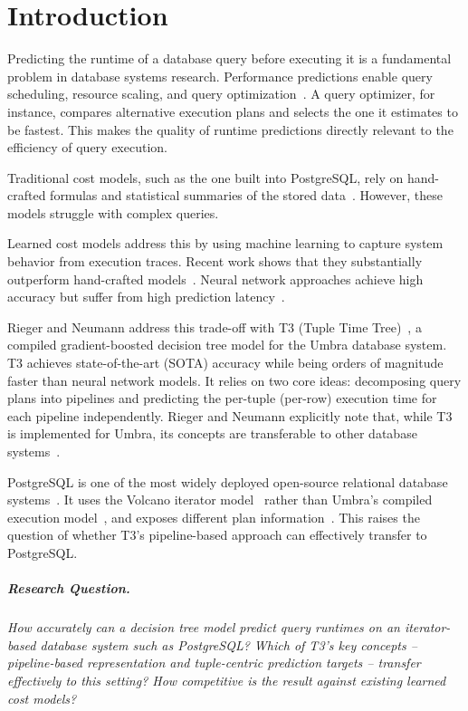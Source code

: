
\chapter{Introduction}\label{chapter:introduction}

Predicting the runtime of a database query before executing it is a fundamental problem in database systems research.
Performance predictions enable query scheduling, resource scaling, and query optimization~\parencite{t3}.
A query optimizer, for instance, compares alternative execution plans and selects the one it estimates to be fastest.
This makes the quality of runtime predictions directly relevant to the efficiency of query execution.

Traditional cost models, such as the one built into PostgreSQL, rely on hand-crafted formulas and statistical summaries of the stored data~\parencite{postgresql_docs_planner_stats}.
However, these models struggle with complex queries.

Learned cost models address this by using machine learning to capture system behavior from execution traces.
Recent work shows that they substantially outperform hand-crafted models~\parencite{zeroshot}.
Neural network approaches achieve high accuracy but suffer from high prediction latency~\parencite{stage}.

Rieger and Neumann address this trade-off with T3 (Tuple Time Tree)~\parencite{t3}, a compiled gradient-boosted decision tree model for the Umbra database system.
T3 achieves state-of-the-art (SOTA) accuracy while being orders of magnitude faster than neural network models.
It relies on two core ideas: decomposing query plans into pipelines and predicting the per-tuple (per-row) execution time for each pipeline independently.
Rieger and Neumann explicitly note that, while T3 is implemented for Umbra, its concepts are transferable to other database systems~\parencite{t3}.

PostgreSQL is one of the most widely deployed open-source relational database systems~\parencite{dbengines}.
It uses the Volcano iterator model~\parencite{graefe1994} rather than Umbra's compiled execution model~\parencite{umbra2020}, and exposes different plan information~\parencite{postgresql_docs_query_path}.
This raises the question of whether T3's pipeline-based approach can effectively transfer to PostgreSQL.

\paragraph{Research Question.}
\textit{How accurately can a decision tree model predict query runtimes on an iterator-based database system such as PostgreSQL?
Which of T3's key concepts -- pipeline-based representation and tuple-centric prediction targets -- transfer effectively to this setting?
How competitive is the result against existing learned cost models?}

